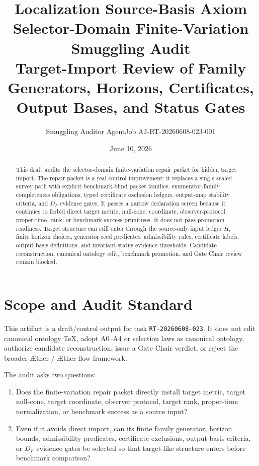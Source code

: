 \documentclass[11pt]{article}
\title{\textbf{Localization Source-Basis Axiom Selector-Domain Finite-Variation Smuggling Audit}\\[0.35em]
\large Target-Import Review of Family Generators, Horizons, Certificates, Output Bases, and Status Gates}
\author{Smuggling Auditor AgentJob AJ-RT-20260608-023-001}
\date{June 10, 2026}
\newcommand{\Aether}{\AE{}ther}
\newcommand{\Aflow}{\AE{}ther-flow}
\newcommand{\TheoryProgram}{\Aether{} / \Aflow{} framework}
\begin{document}
\maketitle

\begin{abstract}
This draft audits the selector-domain finite-variation repair packet for
hidden target import. The repair packet is a real control improvement: it
replaces a single sealed survey path with explicit benchmark-blind packet
families, enumerator-family completeness obligations, typed certificate
exclusion ledgers, output-map stability criteria, and \(D_F\) evidence gates.
It passes a narrow declaration screen because it continues to forbid direct
target metric, null-cone, coordinate, observer-protocol, proper-time, rank,
or benchmark-success primitives. It does not pass promotion readiness. Target
structure can still enter through the source-only input ledger \(H\), finite
horizon choices, generator seed predicates, admissibility rules, certificate
labels, output-basis definitions, and invariant-status evidence thresholds.
Candidate reconstruction, canonical ontology edit, benchmark promotion, and
Gate Chair review remain blocked.
\end{abstract}

\section{Scope and Audit Standard}

This artifact is a draft/control output for task \texttt{RT-20260608-023}.
It does not edit canonical ontology TeX, adopt A0--A4 or selection laws as
canonical ontology, authorize candidate reconstruction, issue a Gate Chair
verdict, or reject the broader \TheoryProgram{}.

The audit asks two questions:
\begin{enumerate}
    \item Does the finite-variation repair packet directly install target
    metric, target null-cone, target coordinate, observer protocol, target
    rank, proper-time normalization, or benchmark success as a source input?
    \item Even if it avoids direct import, can its finite family generator,
    horizon bounds, admissibility predicates, certificate exclusions,
    output-basis criteria, or \(D_F\) evidence gates be selected so that
    target-like structure enters before benchmark comparison?
\end{enumerate}
\end{document}

